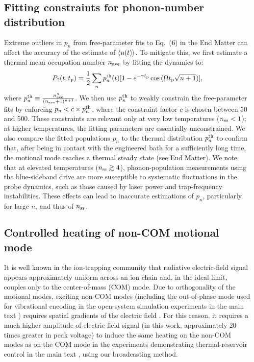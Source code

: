 \documentclass[
reprint,
superscriptaddress,

amsmath,amssymb,
aps,
prl,

floatfix,
]{revtex4-2}
\begin{document}
\vspace{0em}
\subsection*{Fitting constraints for phonon-number distribution} \label{app_constraint}
\vspace{0em}

Extreme outliers in $p_n$ from free-parameter fits to Eq.~(6) in the End Matter \cite{so2025fT} can affect the accuracy of the estimate of $\braket{n(t)}$. To mitigate this, we first estimate a thermal mean occupation number $n_{\rm ave}$ by fitting the dynamics to:
\begin{equation}
    P_{\uparrow} (t,t_{\rm p})=\frac{1}{2}\sum_n p_n^{\rm th}(t)[1-e^{-\gamma t_{\rm p}}\cos{( \Omega t_{\rm p}\sqrt{n+1})}],
    \label{eq_thermal}
\end{equation}
where $p_n^{\rm th}\equiv\frac{n_{\rm ave}^n}{(n_{\rm ave}+1)^{n+1}}$. We then use $p_n^{\rm th}$ to weakly constrain the free-parameter fits by enforcing $p_n<c\times p_n^{\rm th}$, where the constraint factor $c$ is chosen between 50 and 500. These constraints are relevant only at very low temperatures ($n_{\rm ss}<1$); at higher temperatures, the fitting parameters are essentially unconstrained. We also compare the fitted populations $p_n$ to the thermal distribution $p_n^{\rm th}$ to confirm that, after being in contact with the engineered bath for a sufficiently long time, the motional mode reaches a thermal steady state (see End Matter). We note that at elevated temperatures ($n_{\rm ss}\gtrsim 4$), phonon-population measurements using the blue-sideband drive are more susceptible to systematic fluctuations in the probe dynamics, such as those caused by laser power and trap-frequency instabilities. These effects can lead to inaccurate estimations of $p_n$, particularly for large $n$, and thus of $n_{\rm ss}$.

\subsection*{Controlled heating of non-COM motional mode} \label{app_noncom}

It is well known in the ion-trapping community that radiative electric-field signal appears approximately uniform across an ion chain and, in the ideal limit, couples only to the center-of-mass (COM) mode. Due to orthogonality of the motional modes, exciting non-COM modes (including the out-of-phase mode used for vibrational encoding in the open-system simulation experiments in the main text \cite{so2025fT}) requires spatial gradients of the electric field \cite{wineland1997issue,brownnutt2015noise,james2000noise}. For this reason, it requires a much higher amplitude of electric-field signal (in this work, approximately 20 times greater in peak voltage) to induce the same heating on the non-COM modes as on the COM mode in the experiments demonstrating thermal-reservoir control in the main text \cite{so2025fT}, using our broadcasting method.
\end{document}
